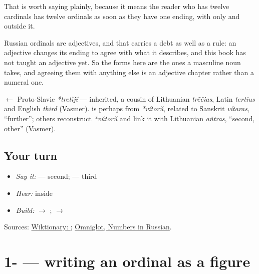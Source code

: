 That is worth saying plainly, because it means the reader who has twelve cardinals has twelve ordinals as soon as they have one ending, with only \textbf{} and \textbf{} outside it.

Russian ordinals are adjectives, and that carries a debt as well as a rule: an adjective changes its ending to agree with what it describes, and this book has not taught an adjective yet. So the forms here are the ones a masculine noun takes, and agreeing them with anything else is an adjective chapter rather than a numeral one.

\begin{cousinweb}
\textbf{} $\leftarrow$ Proto-Slavic \emph{*tretĭjĭ} — inherited, a cousin of Lithuanian \emph{trẽčias}, Latin \emph{tertius} and English \emph{third} (Vasmer). \textbf{} is perhaps from \emph{*vĭtorŭ}, related to Sanskrit \emph{vítaras}, \textquotedblleft{}further\textquotedblright{}; others reconstruct \emph{*vŭtorŭ} and link it with Lithuanian \emph{añtras}, \textquotedblleft{}second, other\textquotedblright{} (Vasmer).
\end{cousinweb}

\subsection*{Your turn}
\begin{itemize}
\raggedright
  \item \emph{Say it:} \textbf{} — second; \textbf{} — third
  \item \emph{Hear:} \textbf{} inside \textbf{}
  \item \emph{Build:} \textbf{} $\to$ \textbf{}; \textbf{} $\to$ \textbf{}
\end{itemize}

\begin{tcolorbox}[breakable,colback=teal!4,colframe=teal!35!black,title={Before you move on}]
Sources: \href{https://en.wiktionary.org/wiki/\%D0\%B2\%D1\%82\%D0\%BE\%D1\%80\%D0\%BE\%D0\%B9}{Wiktionary: }; \href{https://www.omniglot.com/language/numbers/russian.htm}{Omniglot, Numbers in Russian}.
\end{tcolorbox}
\section[\texorpdfstring{1-\ru{й} (pérvyy)}{1-й (pérvyy)}]{1- — writing an ordinal as a figure}

